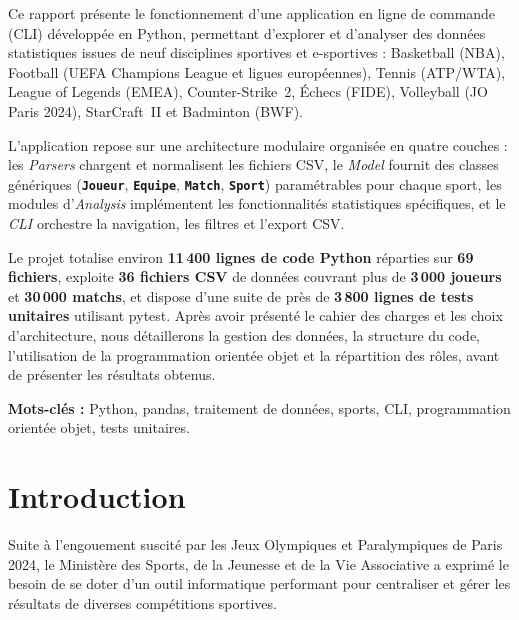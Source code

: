 \documentclass[12pt,a4paper]{article}
\newcommand{\classe}[1]{\texttt{\textbf{#1}}}
\begin{document}
Ce rapport présente le fonctionnement d'une application en ligne de commande (CLI)
développée en Python, permettant d'explorer et d'analyser des données statistiques issues
de neuf disciplines sportives et e-sportives : Basketball (NBA), Football (UEFA Champions
League et ligues européennes), Tennis (ATP/WTA), League of Legends (EMEA), Counter-Strike~2,
Échecs (FIDE), Volleyball (JO Paris 2024), StarCraft~II et Badminton (BWF).

L'application repose sur une architecture modulaire organisée en quatre couches : les
\textit{Parsers} chargent et normalisent les fichiers CSV, le \textit{Model} fournit des
classes génériques (\classe{Joueur}, \classe{Equipe}, \classe{Match}, \classe{Sport})
paramétrables pour chaque sport, les modules d'\textit{Analysis} implémentent les
fonctionnalités statistiques spécifiques, et le \textit{CLI} orchestre la navigation,
les filtres et l'export CSV.

Le projet totalise environ \textbf{11\,400 lignes de code Python} réparties sur
\textbf{69 fichiers}, exploite \textbf{36 fichiers CSV} de données couvrant plus de
\textbf{3\,000 joueurs} et \textbf{30\,000 matchs}, et dispose d'une suite de près de
\textbf{3\,800 lignes de tests unitaires} utilisant pytest. Après avoir présenté le
cahier des charges et les choix d'architecture, nous détaillerons la gestion des données,
la structure du code, l'utilisation de la programmation orientée objet et la répartition
des rôles, avant de présenter les résultats obtenus.

\bigskip
\textbf{Mots-clés :} Python, pandas, traitement de données, sports, CLI, programmation
orientée objet, tests unitaires.

\newpage

\thispagestyle{empty}
\tableofcontents
\newpage

\setcounter{page}{1}

\section{Introduction}

Suite à l'engouement suscité par les Jeux Olympiques et Paralympiques de Paris 2024,
le Ministère des Sports, de la Jeunesse et de la Vie Associative a exprimé le besoin de
se doter d'un outil informatique performant pour centraliser et gérer les résultats de
diverses compétitions sportives.
\end{document}
